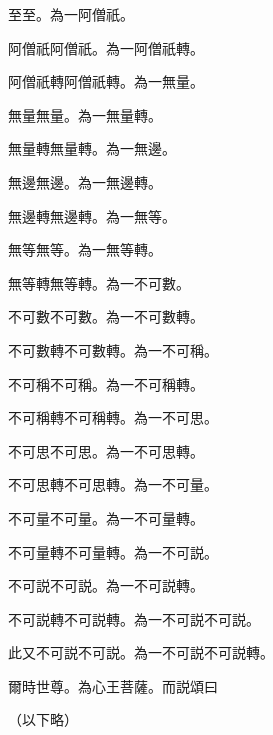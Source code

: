 至至。為一阿僧祇。\par
阿僧祇阿僧祇。為一阿僧祇轉。\par
阿僧祇轉阿僧祇轉。為一無量。\par
無量無量。為一無量轉。\par
無量轉無量轉。為一無邊。\par
無邊無邊。為一無邊轉。\par
無邊轉無邊轉。為一無等。\par
無等無等。為一無等轉。\par
無等轉無等轉。為一不可數。\par
不可數不可數。為一不可數轉。\par
不可數轉不可數轉。為一不可稱。\par
不可稱不可稱。為一不可稱轉。\par
不可稱轉不可稱轉。為一不可思。\par
不可思不可思。為一不可思轉。\par
不可思轉不可思轉。為一不可量。\par
不可量不可量。為一不可量轉。\par
不可量轉不可量轉。為一不可説。\par
不可説不可説。為一不可説轉。\par
不可説轉不可説轉。為一不可説不可説。\par
此又不可説不可説。為一不可説不可説轉。\par
爾時世尊。為心王菩薩。而説頌曰\bigskip\par
\hfil（以下略）
\makeatother
